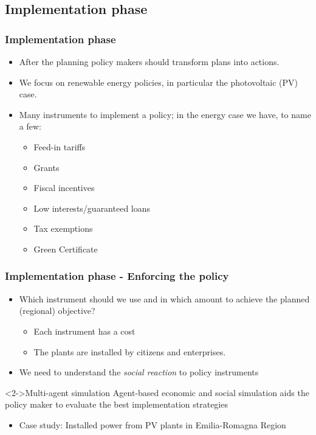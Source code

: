 \documentclass{beamer}
\begin{document}
\subsection{Implementation phase}
	\begin{frame}
	\frametitle{Implementation phase}
		\begin{itemize}
			\item After the planning policy makers should transform plans into actions.
			\item We focus on renewable energy policies, in particular the photovoltaic (PV) case.
			\item Many instruments to implement a policy; in the energy case we have, to name a few:
			\begin{itemize}
				\item Feed-in tariffs 
				\item Grants
				\item Fiscal incentives
				\item Low interests/guaranteed loans
				\item Tax exemptions
				\item Green Certificate
			\end{itemize}
		\end{itemize}
	\end{frame}
	
	\begin{frame}
	\frametitle{Implementation phase - Enforcing the policy}
		\begin{itemize}
		\item Which instrument should we use and in which amount to achieve the planned (regional) objective?
			\begin{itemize}
				\item Each instrument has a cost
				\item The plants are installed by citizens and enterprises.
			\end{itemize}
		\item We need to understand the \emph{social reaction} to policy instruments
		\end{itemize}
		\begin{block}<2->{Multi-agent simulation}
		Agent-based economic and social simulation aids the policy maker to evaluate the best implementation strategies 
		\begin{itemize}
			\item Case study: Installed power from PV plants in Emilia-Romagna Region 
		\end{itemize}
		\end{block}
	\end{frame}
	
\end{document}
